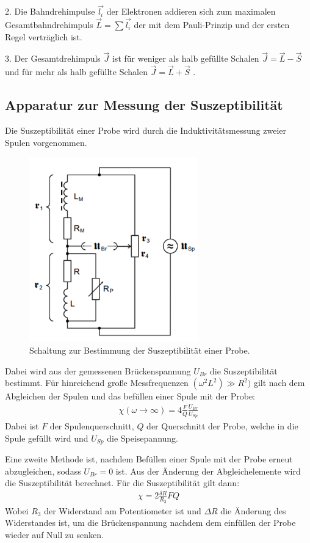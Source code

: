 2. Die Bahndrehimpulse $\vec{l_i}$ der Elektronen addieren sich zum maximalen Gesamtbahndrehimpuls $\vec{L} = \sum \vec{l_i}$ der mit
dem Pauli-Prinzip und der ersten Regel verträglich ist.

3. Der Gesamtdrehimpuls $\vec{J}$ ist für weniger als halb gefüllte Schalen $\vec{J} = \vec{L}- \vec{S}$ und für mehr als halb gefüllte Schalen
$\vec{J} = \vec{L} + \vec{S}$ .


\subsection{Apparatur zur Messung der Suszeptibilität}
Die Suszeptibilität einer Probe wird durch die Induktivitätsmessung zweier Spulen vorgenommen.

\begin{figure}[H]
  \centering
  \includegraphics[height=8cm]{brueckenschaltung.PNG}
  \caption{Schaltung zur Bestimmung der Suszeptibilität einer Probe. \cite{sample}}
  \label{fig:Linienspektrum}
\end{figure}

Dabei wird aus der gemessenen Brückenspannung $U_{Br}$ die Suszeptibilität bestimmt. Für hinreichend große Messfrequenzen
$(\omega^2 L^2) \gg R^2)$ gilt nach dem Abgleichen der Spulen und das befüllen einer Spule mit der Probe:
\begin{align}
  \chi(\omega \rightarrow \infty) = 4 \frac{F}{Q} \frac{U_{Br}}{U_{Sp}}
\end{align}
Dabei ist $F$ der Spulenquerschnitt, $Q$ der Querschnitt der Probe, welche in die Spule gefüllt wird und $U_{Sp}$ die
Speisepannung.

Eine zweite Methode ist, nachdem Befüllen einer Spule mit der Probe erneut abzugleichen, sodass $U_{Br} = 0$ ist. Aus
der Änderung der Abgleichelemente wird die Suszeptibilität berechnet. Für die Suszeptibilität gilt dann:
\begin{align}
  \chi = 2 \frac{\delta R}{R_3}{F}{Q}
\end{align}
Wobei $R_3$ der Widerstand am Potentiometer ist und $\Delta R$ die Änderung des Widerstandes ist, um die
Brückenspannung nachdem dem einfüllen der Probe wieder auf Null zu senken.
